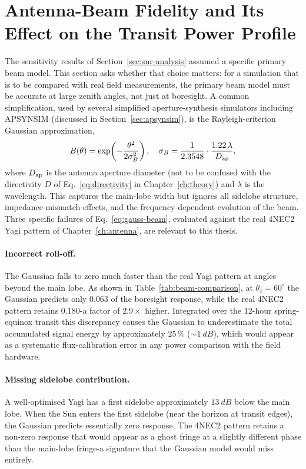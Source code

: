 \section{Antenna-Beam Fidelity and Its Effect on the Transit Power Profile}
\label{sec:beam-fidelity}

The sensitivity results of Section~\ref{sec:snr-analysis} assumed a specific primary
beam model. This section asks whether that choice matters: for a simulation that is
to be compared with real field measurements, the primary beam model must be accurate
at large zenith angles, not just at boresight. A common simplification, used by
several simplified aperture-synthesis simulators including \textsc{APSYNSIM}
(discussed in Section~\ref{sec:apsynsim}), is the Rayleigh-criterion Gaussian
approximation,
\begin{equation}
  B(\theta) = \exp\!\left(-\frac{\theta^2}{2\sigma_B^2}\right),
  \quad
  \sigma_B = \frac{1}{2.3548}\cdot\frac{1.22\,\lambda}{D_{\rm ap}},
  \label{eq:gauss-beam}
\end{equation}
where $D_{\rm ap}$ is the antenna aperture diameter (not to be confused with the
directivity $D$ of Eq.~\eqref{eq:directivity} in Chapter~\ref{ch:theory}) and
$\lambda$ is the wavelength. This captures the
main-lobe width but ignores all sidelobe structure, impedance-mismatch effects, and
the frequency-dependent evolution of the beam. Three specific failures of
Eq.~\eqref{eq:gauss-beam}, evaluated against the real 4NEC2 Yagi pattern of
Chapter~\ref{ch:antenna}, are relevant to this thesis.

\paragraph{Incorrect roll-off.}
The Gaussian falls to zero much faster than the real Yagi pattern at angles beyond
the main lobe. As shown in Table~\ref{tab:beam-comparison}, at
$\theta_z=60^\circ$ the Gaussian predicts only $0.063$ of the boresight response,
while the real 4NEC2 pattern retains $0.180$-a factor of $2.9\times$ higher.
Integrated over the 12-hour spring-equinox transit this discrepancy causes the
Gaussian to underestimate the total accumulated signal energy by approximately
$25\,\%$ ($\sim\!1~\si{dB}$), which would appear as a systematic flux-calibration
error in any power comparison with the field hardware.

\paragraph{Missing sidelobe contribution.}
A well-optimised Yagi has a first sidelobe approximately $13~\si{dB}$ below the
main lobe. When the Sun enters the first sidelobe (near the horizon at transit
edges), the Gaussian predicts essentially zero response. The 4NEC2 pattern retains
a non-zero response that would appear as a ghost fringe at a slightly different phase
than the main-lobe fringe-a signature that the Gaussian model would miss entirely.

